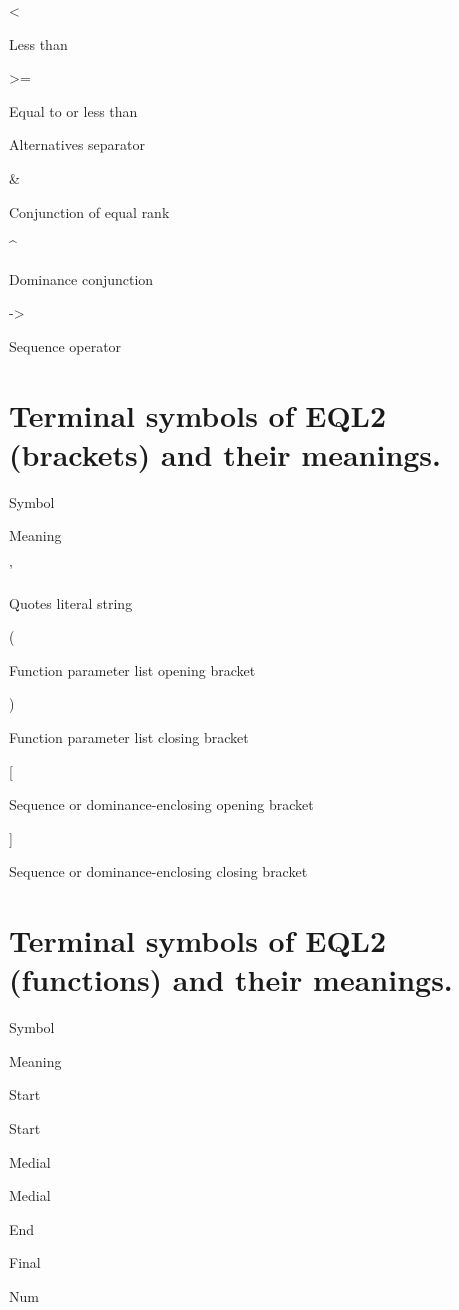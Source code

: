 \documentclass[]{book}
\begin{document}
\textless{}

Less than

\textgreater{}=

Equal to or less than

\textbar{}

Alternatives separator

\&

Conjunction of equal rank

\^{}

Dominance conjunction

-\textgreater{}

Sequence operator

\hypertarget{terminal-symbols-of-eql2-brackets-and-their-meanings.}{%
\section{Terminal symbols of EQL2 (brackets) and their meanings.}\label{terminal-symbols-of-eql2-brackets-and-their-meanings.}}

Symbol

Meaning

'

Quotes literal string

(

Function parameter list opening bracket

)

Function parameter list closing bracket

{[}

Sequence or dominance-enclosing opening bracket

{]}

Sequence or dominance-enclosing closing bracket

\hypertarget{terminal-symbols-of-eql2-functions-and-their-meanings.}{%
\section{Terminal symbols of EQL2 (functions) and their meanings.}\label{terminal-symbols-of-eql2-functions-and-their-meanings.}}

Symbol

Meaning

Start

Start

Medial

Medial

End

Final

Num
\end{document}
